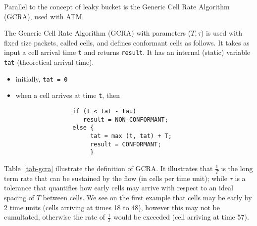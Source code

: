 Parallel to the concept of leaky bucket is the Generic Cell Rate
Algorithm (GCRA),
used with ATM.
\begin{definition}
The Generic Cell Rate
Algorithm (GCRA) with parameters ($T,\tau$) is used with fixed size
packets, called cells, and defines conformant cells as follows.
It takes as input a cell
arrival time {\tt t} and returns {\tt result}. It has an internal
(static) variable {\tt tat} (theoretical arrival time).
\begin{itemize}
        \item  initially, {\tt tat = 0}
        \item  when a cell arrives at time {\tt t}, then
        \begin{verbatim}
                if (t < tat - tau)
                   result = NON-CONFORMANT;
                else {
                     tat = max (t, tat) + T;
                     result = CONFORMANT;
                     }
        \end{verbatim}
\end{itemize}
\end{definition}
Table~\ref{tab-gcra} illustrate the definition of GCRA. It
illustrates that $\frac{1}{T}$ is the long term rate that can be
sustained by the flow (in cells per time unit); while $\tau$ is a
tolerance that quantifies how early cells may arrive with respect
to an ideal spacing of $T$ between cells. We see on the first
example that cells may be early by 2 time units (cells arriving at
times 18 to 48), however this may not be cumultated, otherwise the
rate of $\frac{1}{T}$ would be exceeded (cell arriving at time
57).
